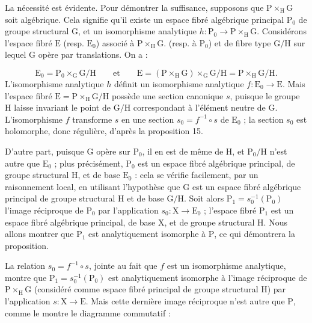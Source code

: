 
La nécessité est évidente. Pour démontrer la suffisance, supposons que $\mathrm{P} \times_{\mathrm{H}} \mathrm{G}$ soit algébrique. Cela signifie qu'il existe un espace fibré algébrique principal $\mathrm{P}_0$ de groupe structural $\mathrm{G}$, et un isomorphisme analytique $h : \mathrm{P}_0 \to \mathrm{P} \times_{\mathrm{H}} \mathrm{G}$. Considérons l'espace fibré $\mathrm{E}$ (resp. $\mathrm{E}_0$) associé à $\mathrm{P} \times_{\mathrm{H}} \mathrm{G}$. (resp. à $\mathrm{P}_0$) et de fibre type $\mathrm{G}/\mathrm{H}$ sur lequel $\mathrm{G}$ opère par translations. On a :

\begin{equation*}
\mathrm{E}_0 = \mathrm{P}_0 \times_{\mathrm{G}} \mathrm{G}/\mathrm{H} \qquad \mathrm{et} \qquad \mathrm{E} = (\mathrm{P} \times_{\mathrm{H}} \mathrm{G}) \times_{\mathrm{G}} \mathrm{G}/\mathrm{H} = \mathrm{P} \times_{\mathrm{H}} \mathrm{G}/\mathrm{H}.
\end{equation*}
L'isomorphisme analytique $h$ définit un isomorphisme analytique $f : \mathrm{E}_0 \to \mathrm{E}$. Mais l'espace fibré $\mathrm{E} = \mathrm{P} \times_{\mathrm{H}} \mathrm{G}/\mathrm{H}$ possède une section canonique $s$, puisque le groupe $\mathrm{H}$ laisse invariant le point de $\mathrm{G}/\mathrm{H}$ correspondant à l'élément neutre de $\mathrm{G}$. L'isomorphisme $f$ transforme $s$ en une section $s_0 = f^{-1} \circ s$ de $\mathrm{E}_0$ ; la section $s_0$ est holomorphe, donc régulière, d'après la proposition 15.

D'autre part, puisque $\mathrm{G}$ opère sur $\mathrm{P}_0$, il en est de même de $\mathrm{H}$, et $\mathrm{P}_0/\mathrm{H}$ n'est autre que $\mathrm{E}_0$ ; plus précisément, $\mathrm{P}_0$ est un espace fibré algébrique principal, de groupe structural $\mathrm{H}$, et de base $\mathrm{E}_0$ : cela se vérifie facilement, par un raisonnement local, en utilisant l'hypothèse que $\mathrm{G}$ est un espace fibré algébrique principal de groupe structural $\mathrm{H}$ et de base $\mathrm{G}/\mathrm{H}$. Soit alors $\mathrm{P}_1 = s_0^{-1}(\mathrm{P}_0)$ l'image réciproque de $\mathrm{P}_0$ par l'application $s_0 : \mathrm{X} \to \mathrm{E}_0$ ; l'espace fibré $\mathrm{P}_1$ est un espace fibré algébrique principal, de base $\mathrm{X}$, et de groupe structural $\mathrm{H}$. Nous allons montrer que $\mathrm{P}_1$ est analytiquement isomorphe à $\mathrm{P}$, ce qui démontrera la proposition.

La relation $s_0 = f^{-1} \circ s$, jointe au fait que $f$ est un isomorphisme analytique, montre que $\mathrm{P}_1 = s_0^{-1}(\mathrm{P}_0)$ est analytiquement isomorphe à l'image réciproque de $\mathrm{P} \times_{\mathrm{H}} \mathrm{G}$ (considéré comme espace fibré principal de groupe structural $\mathrm{H}$) par l'application $s : \mathrm{X} \to \mathrm{E}$. Mais cette dernière image réciproque n'est autre que $\mathrm{P}$, comme le montre le diagramme commutatif :


